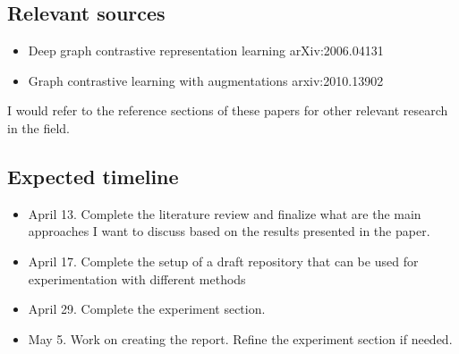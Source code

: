 \documentclass[12pt,a4paper]{article}
\begin{document}
\subsection*{Relevant sources}
\begin{itemize}
    \item Deep graph contrastive representation learning arXiv:2006.04131
    \item Graph contrastive learning with augmentations arxiv:2010.13902
\end{itemize}

I would refer to the reference sections of these papers for other relevant research in the field.

\subsection*{Expected timeline}
\begin{itemize}
    \item April 13. Complete the literature review and finalize what are the main approaches I want to discuss based on the results presented in the paper.
    \item April 17. Complete the setup of a draft repository that can be used for experimentation with different methods
    \item April 29. Complete the experiment section.
    \item May 5. Work on creating the report. Refine the experiment section if needed.
\end{itemize}
\end{document}
